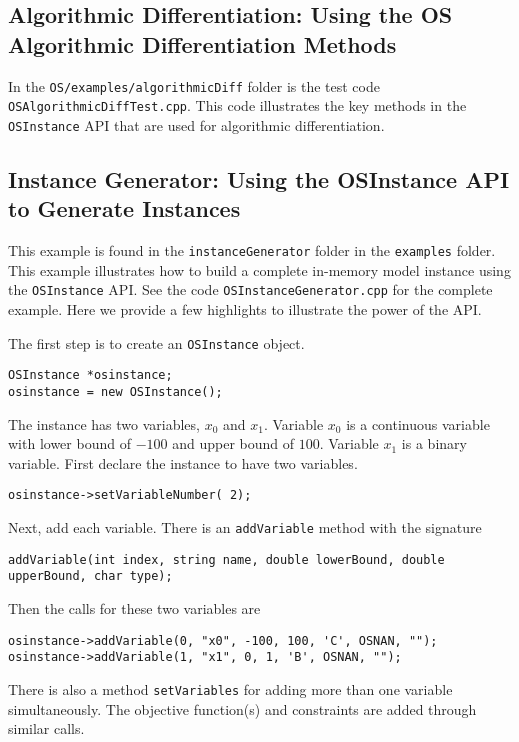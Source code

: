 \documentclass[11pt]{article}
\renewcommand{\_}{{\char"5F}}
\renewcommand{\{}{{\char"7B}}
\renewcommand{\}}{{\char"7D}}
\renewcommand{\^}{{\char"0D}}
\renewcommand{\'}{{\char"0D}}
\begin{document}
\subsection{Algorithmic Differentiation:  Using the OS Algorithmic Differentiation Methods}\label{section:cppad}

In the {\tt OS/examples/algorithmicDiff} folder is the test code {\tt OSAlgorithmicDiffTest.cpp}. This code
illustrates the key methods in the {\tt OSInstance} API that are used for
algorithmic differentiation.   


\subsection{Instance Generator: Using the OSInstance API to Generate Instances}\label{section:exampleOSInstanceGeneration}

This example is found in the {\tt instanceGenerator} folder in the {\tt examples} folder. This example illustrates
how to build a complete in-memory model instance using the {\tt OSInstance} API.
See the code {\tt OSInstanceGenerator.cpp} for the complete example. Here we provide a few highlights to illustrate
the power of the API.

The first step is to create an {\tt OSInstance} object.
\begin{verbatim}
OSInstance *osinstance;
osinstance = new OSInstance();
\end{verbatim}

The instance has two variables, $x_{0}$ and $x_{1}$. Variable $x_{0}$ is a continuous variable with lower bound of $-100$ and upper bound of $100$. Variable $x_{1}$ is a binary variable. First declare the instance to have two variables.
\begin{verbatim}
osinstance->setVariableNumber( 2);
\end{verbatim}
Next, add each variable. There is an {\tt addVariable} method with the signature
\begin{verbatim}
addVariable(int index, string name, double lowerBound, double upperBound, char type);
\end{verbatim}
Then the calls for these two variables are
\begin{verbatim}
osinstance->addVariable(0, "x0", -100, 100, 'C', OSNAN, "");
osinstance->addVariable(1, "x1", 0, 1, 'B', OSNAN, "");
\end{verbatim}
There is also a method {\tt setVariables} for adding more than one variable simultaneously.  The objective function(s) and constraints are added through similar calls.
\end{document}
